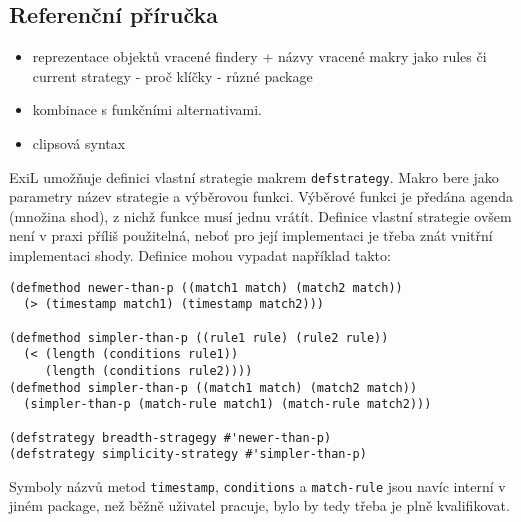\subsection{Referenční příručka}
\begin{framed}
  \begin{itemize}
    \item reprezentace objektů vracené findery + názvy vracené makry jako rules či current
strategy - proč klíčky - různé package
    \item kombinace s funkčními alternativami.
    \item clipsová syntax
  \end{itemize}
\end{framed}

ExiL umožňuje definici vlastní strategie makrem \verb|defstrategy|. Makro bere
jako parametry název strategie a výběrovou funkci. Výběrové funkci je předána
agenda (množina shod), z nichž funkce musí jednu vrátít. Definice vlastní
strategie ovšem není v praxi příliš použitelná, neboť pro její implementaci je
třeba znát vnitřní implementaci shody. Definice mohou vypadat například takto:
\begin{verbatim}
(defmethod newer-than-p ((match1 match) (match2 match))
  (> (timestamp match1) (timestamp match2)))

(defmethod simpler-than-p ((rule1 rule) (rule2 rule))
  (< (length (conditions rule1))
     (length (conditions rule2))))
(defmethod simpler-than-p ((match1 match) (match2 match))
  (simpler-than-p (match-rule match1) (match-rule match2)))

(defstrategy breadth-stragegy #'newer-than-p)
(defstrategy simplicity-strategy #'simpler-than-p)
\end{verbatim}
Symboly názvů metod \verb|timestamp|, \verb|conditions| a \verb|match-rule| jsou
navíc interní v jiném package, než běžně uživatel pracuje, bylo by tedy třeba je
plně kvalifikovat.

